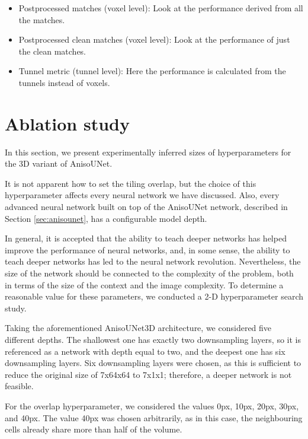 \documentclass[
  digital,     %
  oneside,     %
  nosansbold,  %
  nocolorbold, %
  lof,         %
  lot,         %
]{fithesis4}
\begin{document}
\begin{itemize}
    \item{Postprocessed matches (voxel level): Look at the performance derived from all the matches.}
    \item{Postprocessed clean matches (voxel level): Look at the performance of just the clean matches.}
    \item{Tunnel metric (tunnel level): Here the performance is calculated from the tunnels instead of voxels.}
\end{itemize}

\section{Ablation study}
\label{sec:ablationstudy}
In this section, we present experimentally inferred sizes of hyperparameters for the 3D variant of AnisoUNet.

It is not apparent how to set the tiling overlap, but the choice of this hyperparameter affects every neural network we have discussed. Also, every advanced neural network built on top of the AnisoUNet network, described in Section \ref{sec:anisounet}, has a configurable model depth.

In general, it is accepted that the ability to teach deeper networks has helped improve the performance of neural networks, and, in some sense, the ability to teach deeper networks has led to the neural network revolution. Nevertheless, the size of the network should be connected to the complexity of the problem, both in terms of the size of the context and the image complexity. To determine a reasonable value for these parameters, we conducted a 2-D hyperparameter search study. 


Taking the aforementioned AnisoUNet3D architecture, we considered five different depths. The shallowest one has exactly two downsampling layers, so it is referenced as a network with depth equal to two, and the deepest one has six downsampling layers. Six downsampling layers were chosen, as this is sufficient to reduce the original size of 7x64x64 to 7x1x1; therefore, a deeper network is not feasible.

For the overlap hyperparameter, we considered the values 0px, 10px, 20px, 30px, and 40px. The value 40px was chosen arbitrarily, as in this case, the neighbouring cells already share more than half of the volume.
\end{document}
